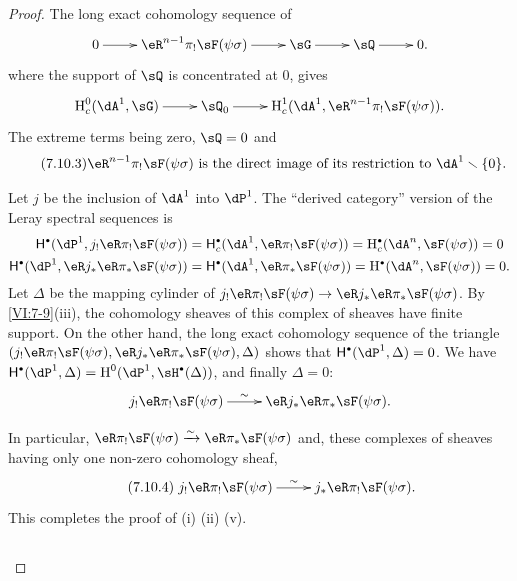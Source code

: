 \begin{proof}[Proof]
The long exact cohomology sequence of 
\[\xymatrix{
  0 \ar[r] 
    & \eR^{n-1} \pi_! \sF(\psi\sigma) \ar[r] 
    & \sG \ar[r] 
    & \sQ \ar[r] 
    & 0 \text{.} 
}\]
where the support of $\sQ$ is concentrated at $0$, gives 
\[\xymatrix{
  \h_c^0(\dA^1,\sG) \ar[r] 
    & \sQ_0 \ar[r] 
    & \h_c^1(\dA^1,\eR^{n-1} \pi_! \sF(\psi\sigma)) \text{.} 
}\]
The extreme terms being zero, $\sQ=0$ and 
\begin{equation*}\tag{7.10.3}\label{VI:eq:7-10-3}
  \text{$\eR^{n-1} \pi_! \sF(\psi\sigma)$ is the direct image of its restriction to $\dA^1\setminus \{0\}$.}
\end{equation*}

Let $j$ be the inclusion of $\dA^1$ into $\dP^1$. The ``derived
category'' version of the Leray spectral sequences is 
\begin{align*}
  \hh^\bullet(\dP^1,j_! \eR\pi_! \sF(\psi\sigma)) &= \hh_c^\bullet(\dA^1,\eR \pi_! \sF(\psi\sigma)) = \h_c^\bullet(\dA^n,\sF(\psi\sigma)) = 0 \\
  \hh^\bullet(\dP^1,\eR j_\ast \eR \pi_\ast \sF(\psi\sigma)) &= \hh^\bullet(\dA^1,\eR \pi_\ast \sF(\psi\sigma)) = \h^\bullet(\dA^n,\sF(\psi\sigma)) = 0 \text{.}
\end{align*}
Let $\Delta$ be the mapping cylinder of
$j_! \eR\pi_! \sF(\psi\sigma) \to \eR j_\ast \eR \pi_\ast \sF(\psi\sigma)$.
By \ref{VI:7-9}(iii), the cohomology sheaves of this complex of
sheaves have finite support. On the other hand, the long exact
cohomology sequence of the triangle
$(j_!\eR \pi_! \sF(\psi\sigma),\eR j_\ast \eR \pi_\ast \sF(\psi\sigma),\Delta)$
shows that $\hh^\bullet(\dP^1,\Delta)=0$. We have
$\hh^\bullet(\dP^1,\Delta) = \h^0(\dP^1,\sH^\bullet(\Delta))$, and finally
$\Delta=0$: 
\[\xymatrix{
  j_! \eR\pi_! \sF(\psi\sigma) \ar[r]^-\sim 
    & \eR j_\ast \eR \pi_\ast \sF(\psi\sigma) \text{.} 
}\]

In particular, $\eR\pi_! \sF(\psi\sigma)\iso \eR\pi_\ast \sF(\psi\sigma)$ and,
these complexes of sheaves having only one non-zero cohomology sheaf, 
\begin{equation*}\tag{7.10.4}\label{VI:eq:7-10-4}
\xymatrix{
  j_! \eR \pi_! \sF(\psi\sigma) \ar[r]^-\sim 
    & j_\ast \eR \pi_! \sF(\psi\sigma) \text{.} 
}
\end{equation*}
This completes the proof of (i) (ii) (v). 





\subsection{}\label{VI:7-11}


\end{proof}
